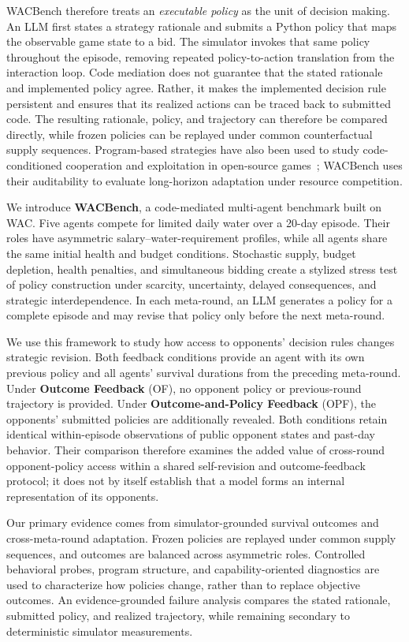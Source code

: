 \documentclass[letterpaper]{article} %
\begin{document}
WACBench therefore treats an \emph{executable policy} as the unit of decision
making. An LLM first states a strategy rationale and submits a Python policy
that maps the observable game state to a bid. The simulator invokes that same
policy throughout the episode, removing repeated policy-to-action translation
from the interaction loop. Code mediation does not guarantee that the stated
rationale and implemented policy agree. Rather, it makes the implemented
decision rule persistent and ensures that its realized actions can be traced
back to submitted code. The resulting rationale, policy, and trajectory can
therefore be compared directly, while frozen policies can be replayed under
common counterfactual supply sequences. Program-based strategies have also
been used to study code-conditioned cooperation and exploitation in
open-source games~\cite{sistla2025opensourcegames}; WACBench uses their
auditability to evaluate long-horizon adaptation under resource competition.

We introduce \textbf{WACBench}, a code-mediated multi-agent benchmark built
on WAC. Five agents compete for limited daily water over a 20-day episode.
Their roles have asymmetric salary--water-requirement profiles, while all
agents share the same initial health and budget conditions. Stochastic supply,
budget depletion, health penalties, and simultaneous bidding create a
stylized stress test of policy construction under scarcity, uncertainty,
delayed consequences, and strategic interdependence. In each meta-round, an
LLM generates a policy for a complete episode and may revise that policy only
before the next meta-round.

We use this framework to study how access to opponents' decision rules changes
strategic revision. Both feedback conditions provide an agent with its own
previous policy and all agents' survival durations from the preceding
meta-round. Under \textbf{Outcome Feedback} (OF), no opponent policy or
previous-round trajectory is provided. Under \textbf{Outcome-and-Policy
Feedback} (OPF), the opponents' submitted policies are additionally revealed.
Both conditions retain identical within-episode observations of public
opponent states and past-day behavior. Their comparison therefore examines
the added value of cross-round opponent-policy access within a shared
self-revision and outcome-feedback protocol; it does not by itself establish
that a model forms an internal representation of its opponents.

Our primary evidence comes from simulator-grounded survival outcomes and
cross-meta-round adaptation. Frozen policies are replayed under common supply
sequences, and outcomes are balanced across asymmetric roles. Controlled
behavioral probes, program structure, and capability-oriented diagnostics are
used to characterize how policies change, rather than to replace objective
outcomes. An evidence-grounded failure analysis compares the stated rationale,
submitted policy, and realized trajectory, while remaining secondary to
deterministic simulator measurements.
\end{document}
